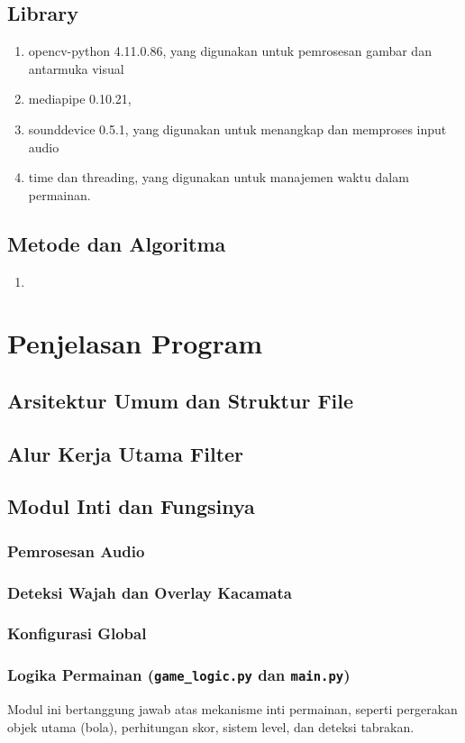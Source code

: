 \documentclass[11pt,a4paper]{article}
\begin{document}
\subsection{Library}
\begin{enumerate}
    \item opencv-python 4.11.0.86, yang digunakan untuk pemrosesan gambar dan antarmuka visual
    \item mediapipe 0.10.21, 
    \item sounddevice 0.5.1, yang digunakan untuk menangkap dan memproses input audio
    \item time dan threading, yang digunakan untuk manajemen waktu dalam permainan.
\end{enumerate}

\subsection{Metode dan Algoritma}
\begin{enumerate}
    \item 
\end{enumerate}

\section{Penjelasan Program}
\subsection{Arsitektur Umum dan Struktur File}
\subsection{Alur Kerja Utama Filter}
\subsection{Modul Inti dan Fungsinya}
\subsubsection{Pemrosesan Audio}
\subsubsection{Deteksi Wajah dan Overlay Kacamata}
\subsubsection{Konfigurasi Global}
\subsubsection{Logika Permainan (\texttt{game\_logic.py} dan \texttt{main.py})}
Modul ini bertanggung jawab atas mekanisme inti permainan, seperti pergerakan objek utama (bola), perhitungan skor, sistem level, dan deteksi tabrakan.
\end{document}
